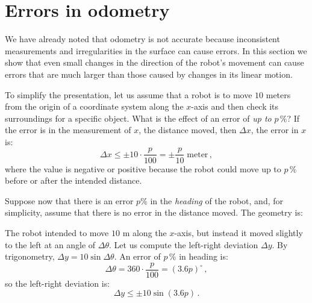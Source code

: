 \section{Errors in odometry}\label{s.odometry-errors}

We have already noted that odometry is not accurate because inconsistent measurements and irregularities in the surface can cause errors. In this section we show that even small changes in the direction of the robot's movement can cause errors that are much larger than those caused by changes in its linear motion.

To simplify the presentation, let us assume that a robot is to move $10$ meters from the origin of a coordinate system along the $x$-axis and then check its surroundings for a specific object. What is the effect of an error of \emph{up to} $p\,\%$? If the error is in the measurement of $x$, the distance moved, then $\Delta x$, the error in $x$ is:
\[\Delta x \leq \pm 10\cdot\frac{p}{100} = \pm\frac{p}{10}\; \textrm{meter}\,,\]
where the value is negative or positive because the robot could move up to $p\,\%$ before or after the intended distance.

Suppose now that there is an error $p\%$ in the \emph{heading} of the robot, and, for simplicity, assume that there is no error in the distance moved. The geometry is:
\begin{center}
\end{center}
The robot intended to move $10$ m along the $x$-axis, but instead it moved slightly to the left at an angle of $\Delta \theta$. Let us compute the left-right deviation $\Delta y$. By trigonometry, $\Delta y = 10\sin \Delta\theta$. An error of $p\,\%$ in heading is:
\[
\Delta\theta=360\cdot\frac{p}{100}=(3.6p)^\circ\,,
\]
so the left-right deviation is:
\[
\Delta y \leq \pm 10 \sin (3.6p)\,.
\]

